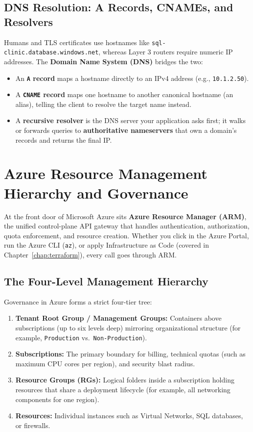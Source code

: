 \subsection{DNS Resolution: A Records, CNAMEs, and Resolvers}
Humans and TLS certificates use hostnames like \texttt{sql-clinic.database.windows.net}, whereas Layer 3 routers require numeric IP addresses. The \textbf{Domain Name System (DNS)} bridges the two:
\begin{itemize}[leftmargin=12pt]
  \item An \textbf{\texttt{A} record} maps a hostname directly to an IPv4 address (e.g., \texttt{10.1.2.50}).
  \item A \textbf{\texttt{CNAME} record} maps one hostname to another canonical hostname (an alias), telling the client to resolve the target name instead.
  \item A \textbf{recursive resolver} is the DNS server your application asks first; it walks or forwards queries to \textbf{authoritative nameservers} that own a domain's records and returns the final IP.
\end{itemize}

\section{Azure Resource Management Hierarchy and Governance}

At the front door of Microsoft Azure sits \textbf{Azure Resource Manager (ARM)}, the unified control-plane API gateway that handles authentication, authorization, quota enforcement, and resource creation. Whether you click in the Azure Portal, run the Azure CLI (\texttt{az}), or apply Infrastructure as Code (covered in Chapter~\ref{chap:terraform}), every call goes through ARM.

\subsection{The Four-Level Management Hierarchy}
Governance in Azure forms a strict four-tier tree:
\begin{enumerate}[leftmargin=15pt]
  \item \textbf{Tenant Root Group / Management Groups:} Containers above subscriptions (up to six levels deep) mirroring organizational structure (for example, \texttt{Production} vs.\ \texttt{Non-Production}).
  \item \textbf{Subscriptions:} The primary boundary for billing, technical quotas (such as maximum CPU cores per region), and security blast radius.
  \item \textbf{Resource Groups (RGs):} Logical folders inside a subscription holding resources that share a deployment lifecycle (for example, all networking components for one region).
  \item \textbf{Resources:} Individual instances such as Virtual Networks, SQL databases, or firewalls.
\end{enumerate}

